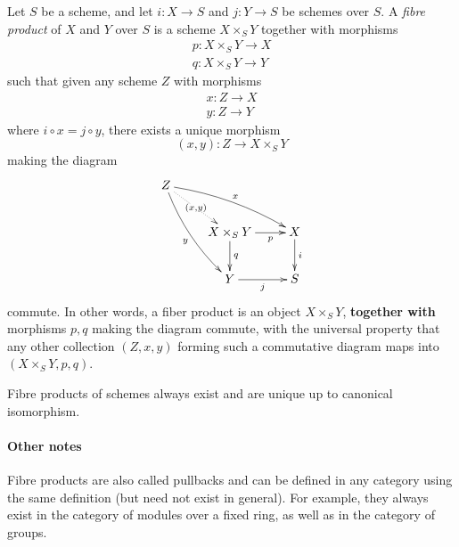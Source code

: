 \documentclass[12pt]{article}
\newcommand{\lra}{\longrightarrow}
\begin{document}
Let $S$ be a scheme, and let $i: X \lra S$ and $j: Y \lra S$ be schemes over $S$. A {\em fibre product} of $X$ and $Y$ over $S$ is a scheme $X \times_S Y$ together with morphisms
\begin{eqnarray*}
& p: X \times_S Y \lra X & \\
& q: X \times_S Y \lra Y &
\end{eqnarray*}
such that given any scheme $Z$ with morphisms
\begin{eqnarray*}
& x: Z \lra X & \\
& y: Z \lra Y &
\end{eqnarray*}
where $i \circ x = j \circ y$, there exists a unique morphism
$$
(x,y): Z \lra X \times_S Y
$$
making the diagram
$$
\xymatrix{
Z \ar@/_/[ddr]_y \ar@/^/[drr]^x \ar@{.>}[dr]|-{(x,y)} \\
& X \times_S Y \ar[d]^-q \ar[r]_-p & X \ar[d]^-i \\
& Y \ar[r]_-j & S
}
$$
commute. In other words, a fiber product is an object $X \times_S Y$, {\bf together with} morphisms $p,q$ making the diagram commute, with the universal property that any other collection $(Z,x,y)$ forming such a commutative diagram maps into $(X\times_S Y,p,q)$.

Fibre products of schemes always exist and are unique up to canonical isomorphism.

\paragraph{Other notes}

Fibre products are also called pullbacks and can be defined in any category using the same definition (but need not exist in general). For example, they always exist in the category of modules over a fixed ring, as well as in the category of groups.
\end{document}
